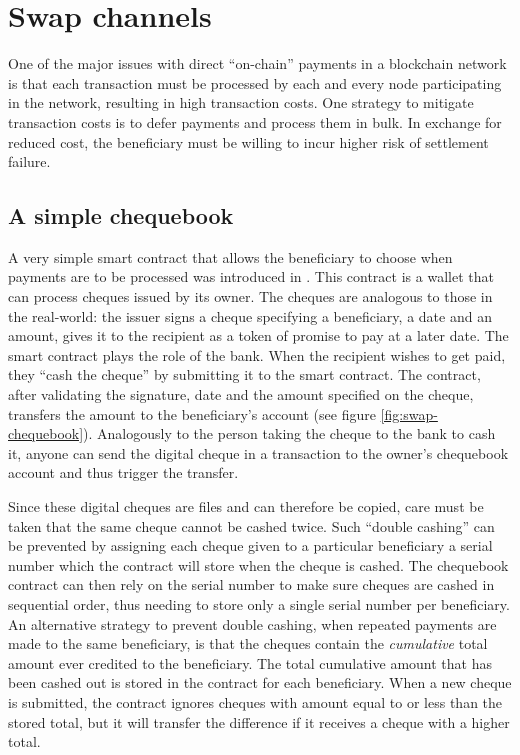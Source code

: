 
\section{Swap channels}

One of the major issues with direct ``on-chain'' payments in a blockchain network is that each transaction must be processed by each and every node participating in the network, resulting in high transaction costs.
One strategy to mitigate transaction costs is to defer payments and process them in bulk. In exchange for reduced cost, the beneficiary must be willing to incur higher risk of settlement failure.

\subsection{A simple chequebook}\label{subsec:simple-chequebook}

A very simple smart contract that allows the beneficiary to choose when payments are to be processed was introduced in \cite{ethersphere2016sw3}.
This  contract is a wallet that can process cheques issued by its owner. The cheques are analogous to those in the real-world: the issuer signs a cheque specifying a beneficiary, a date and an amount, gives it to the recipient as a token of promise to pay at a later date. The smart contract plays the role of the bank. When the recipient wishes to get paid, they ``cash the cheque'' by submitting it to the smart contract. The contract, after validating the signature, date and the amount specified on the cheque, transfers the amount to the beneficiary's account (see figure \ref{fig:swap-chequebook}). Analogously to the person taking the cheque to the bank to cash it, anyone can send the digital cheque in a transaction to the owner's chequebook account and thus trigger the transfer. 



Since these digital cheques are files and can therefore be copied, care must be taken that the same cheque cannot be cashed twice. Such ``double cashing'' can be prevented by assigning each cheque given to a particular beneficiary a serial number which the contract will store when the cheque is cashed. The chequebook contract can then rely on the serial number to make sure cheques are cashed in sequential order, thus needing to store only a single serial number per beneficiary.
An alternative strategy to prevent double cashing, when repeated payments are made to the same beneficiary, is that the cheques contain the \emph{cumulative} total amount ever credited to the beneficiary. The total cumulative amount that has been cashed out is stored in the contract for each beneficiary. When a new cheque is submitted, the contract ignores cheques with amount equal to or less than the stored total, but it will transfer the difference if it receives a cheque with a higher total.

